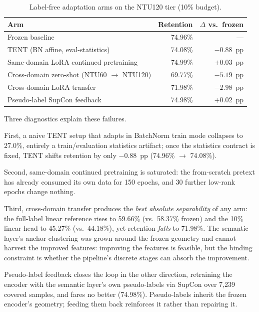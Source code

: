 \documentclass[preprint,12pt,number]{elsarticle}
\begin{document}
\begin{table}[t]
\centering
\caption{Label-free adaptation arms on the NTU120 tier (10\% budget).}
\label{tab:labelfree}
\begin{tabular}{@{}lrr@{}}
\toprule
Arm & Retention & $\Delta$ vs.\ frozen \\
\midrule
Frozen baseline                         & 74.96\% & --- \\
TENT (BN affine, eval-statistics)       & 74.08\% & $-0.88$~pp \\
Same-domain LoRA continued pretraining  & 74.99\% & $+0.03$~pp \\
Cross-domain zero-shot (NTU60 $\rightarrow$ NTU120) & 69.77\% & $-5.19$~pp \\
Cross-domain LoRA transfer              & 71.98\% & $-2.98$~pp \\
Pseudo-label SupCon feedback            & 74.98\% & $+0.02$~pp \\
\bottomrule
\end{tabular}
\end{table}

Three diagnostics explain these failures.

First, a naive TENT setup that adapts in BatchNorm train mode collapses to
27.0\%, entirely a train/evaluation statistics artifact; once the statistics
contract is fixed, TENT shifts retention by only $-0.88$~pp (74.96\% $\rightarrow$ 74.08\%).

Second, same-domain continued pretraining is saturated: the from-scratch
pretext has already consumed its own data for 150 epochs, and 30 further
low-rank epochs change nothing.

Third, cross-domain transfer produces the \emph{best absolute separability} of any
arm: the full-label linear reference rises to 59.66\% (vs.\ 58.37\% frozen) and
the 10\% linear head to 45.27\% (vs.\ 44.18\%), yet retention \emph{falls} to
71.98\%. The semantic layer's anchor clustering was grown around the frozen
geometry and cannot harvest the improved features: improving the features is
feasible, but the binding constraint is whether the pipeline's discrete
stages can absorb the improvement.

Pseudo-label feedback closes the loop in the other direction, retraining
the encoder with the semantic layer's own pseudo-labels via SupCon over 7,239
covered samples, and fares no better (74.98\%). Pseudo-labels inherit the frozen encoder's
geometry; feeding them back reinforces it rather than repairing it.
\end{document}
